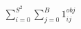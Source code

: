 \documentclass[preview]{standalone}
\begin{document}
\begin{align*}
\sum_{i=0}^{S^{2}}\sum_{j=0}^{B}1_{ij}^{obj}
\end{align*}
\end{document}
